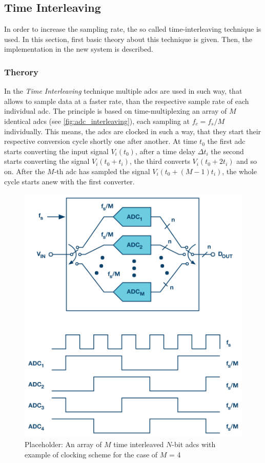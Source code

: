 \subsection{Time Interleaving}\label{sssec:time-interleaving}
In order to increase the sampling rate, the so called time-interleaving technique is used. In this section, first basic theory about this technique is given. Then, the implementation in the new system is described.

\subsubsection{Therory}
In the \textit{Time Interleaving} technique multiple \glspl{adc} are used in such way, that allows to sample data at a faster rate, than the respective sample rate of each individual \gls{adc}. The principle is based on time-multiplexing an array of $M$ identical \glspl{adc} (see \autoref{fig:adc_interleaving}), each sampling at $f_c = f_s/M$ individually. This means, the \glspl{adc} are clocked in such a way, that they start their respective conversion cycle shortly one after another. At time $t_0$ the first \gls{adc} starts converting the input signal $V_i(t_0)$, after a time delay $\Delta t_i$ the second starts converting the signal $V_i(t_0 + t_i)$, the third converts $V_i(t_0 + 2t_i)$ and so on. After the $M$-th \gls{adc} has sampled the signal $V_i(t_0 + (M-1)t_i)$, the whole cycle starts anew with the first converter. \cite{mangrob}
\begin{figure}[tbh]
	\centering
	\includegraphics[width = \textwidth]{chap/02-theory/img/adc_inter}
	\caption[Time Interleaving]{Placeholder: An array of $M$ time interleaved $N$-bit \glspl{adc} with example of clocking scheme for the case of $M$ = 4 \cite{mangrob}}
	\label{fig:adc_interleaving}
\end{figure}
